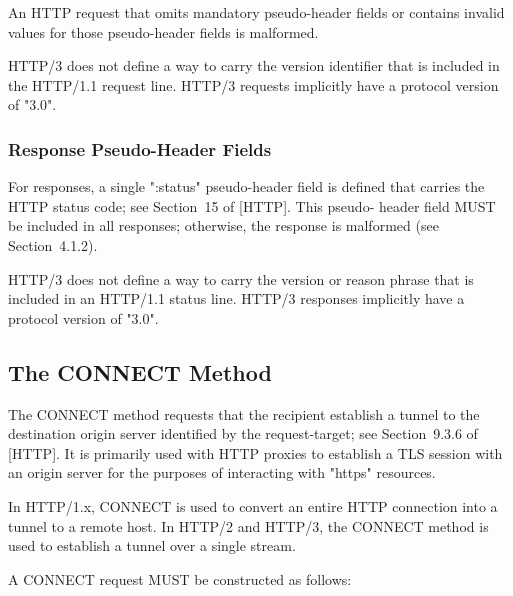\documentclass{article}
\begin{document}
An HTTP request that omits mandatory pseudo-header fields or contains invalid values for those pseudo-header fields is malformed.

HTTP/3 does not define a way to carry the version identifier that is included in the HTTP/1.1 request line.  HTTP/3 requests implicitly have a protocol version of "3.0".

\subsubsection{Response Pseudo-Header Fields}

For responses, a single ":status" pseudo-header field is defined that carries the HTTP status code; see Section~15 of [HTTP].  This pseudo- header field MUST be included in all responses; otherwise, the response is malformed (see Section~4.1.2).

HTTP/3 does not define a way to carry the version or reason phrase that is included in an HTTP/1.1 status line.  HTTP/3 responses implicitly have a protocol version of "3.0".

\subsection{The CONNECT Method}

The CONNECT method requests that the recipient establish a tunnel to the destination origin server identified by the request-target; see Section~9.3.6 of [HTTP].  It is primarily used with HTTP proxies to establish a TLS session with an origin server for the purposes of interacting with "https" resources.

In HTTP/1.x, CONNECT is used to convert an entire HTTP connection into a tunnel to a remote host.  In HTTP/2 and HTTP/3, the CONNECT method is used to establish a tunnel over a single stream.

A CONNECT request MUST be constructed as follows:
\end{document}
